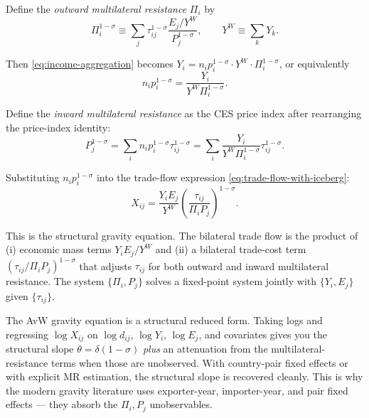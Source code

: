\documentclass[11pt,letterpaper,oneside]{book}
\theoremstyle{definition}
\theoremstyle{remark}
\begin{document}
Define the \emph{outward multilateral resistance} $\Pi_i$ by
\begin{equation}
\Pi_i^{1-\sigma} \equiv \sum_j \tau_{ij}^{1-\sigma} \frac{E_j/Y^W}{P_j^{1-\sigma}}, \qquad Y^W \equiv \sum_k Y_k.
\label{eq:outward-MR}
\end{equation}

Then \eqref{eq:income-aggregation} becomes $Y_i = n_i p_i^{1-\sigma} \cdot Y^W \cdot \Pi_i^{1-\sigma}$, or equivalently
\begin{equation}
n_i p_i^{1-\sigma} = \frac{Y_i}{Y^W \Pi_i^{1-\sigma}}.
\end{equation}

Define the \emph{inward multilateral resistance} as the CES price index after rearranging the price-index identity:
\begin{equation}
P_j^{1-\sigma} = \sum_i n_i p_i^{1-\sigma} \tau_{ij}^{1-\sigma} = \sum_i \frac{Y_i}{Y^W \Pi_i^{1-\sigma}} \tau_{ij}^{1-\sigma}.
\label{eq:inward-MR}
\end{equation}

Substituting $n_i p_i^{1-\sigma}$ into the trade-flow expression \eqref{eq:trade-flow-with-iceberg}:
\begin{equation}
\boxed{X_{ij} = \frac{Y_i E_j}{Y^W} \left( \frac{\tau_{ij}}{\Pi_i P_j} \right)^{1-\sigma}.}
\label{eq:avw-gravity}
\end{equation}

This is the structural gravity equation. The bilateral trade flow is the product of (i) economic mass terms $Y_i E_j / Y^W$ and (ii) a bilateral trade-cost term $(\tau_{ij}/\Pi_i P_j)^{1-\sigma}$ that adjusts $\tau_{ij}$ for both outward and inward multilateral resistance. The system $\{\Pi_i, P_j\}$ solves a fixed-point system jointly with $\{Y_i, E_j\}$ given $\{\tau_{ij}\}$.

\begin{tcolorbox}[insight]
The AvW gravity equation is a structural reduced form. Taking logs and regressing $\log X_{ij}$ on $\log d_{ij}$, $\log Y_i$, $\log E_j$, and covariates gives you the structural slope $\theta = \delta(1-\sigma)$ \emph{plus} an attenuation from the multilateral-resistance terms when those are unobserved. With country-pair fixed effects or with explicit MR estimation, the structural slope is recovered cleanly. This is why the modern gravity literature uses exporter-year, importer-year, and pair fixed effects --- they absorb the $\Pi_i, P_j$ unobservables.
\end{tcolorbox}
\end{document}
